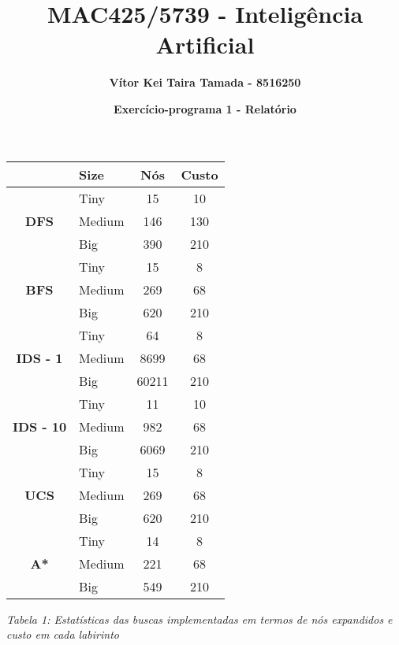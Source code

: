 \documentclass{article}
\title{\textbf{MAC425/5739 - Inteligência Artificial}}
\author{\textbf{Vítor Kei Taira Tamada - 8516250}}
\date{\textbf{Exercício-programa 1 - Relatório}}
\begin{document}
\maketitle


\begin{center}
	\begin{tabular}{c | l | c | c}
		\hline
			&
			\textbf{Size}&
			\textbf{Nós}&
			\textbf{Custo} \\ \hline
			& Tiny & 15 & 10 \\
			\textbf{DFS} & Medium & 146 & 130\\
			& Big & 390 & 210 \\ \hline
			
			& Tiny & 15 & 8 \\ 
			\textbf{BFS}& Medium & 269 & 68 \\
			& Big & 620 & 210 \\ \hline
			
			& Tiny & 64 & 8 \\
			\textbf{IDS - 1 \footnotemark } & Medium & 8699 & 68 \\
			& Big & 60211 & 210 \\ \hline
			
			& Tiny & 11 & 10 \\
			\textbf{IDS - 10 \footnotemark[\value{footnote}] } & Medium & 982 & 68 \\
			& Big & 6069 & 210 \\ \hline
			
			& Tiny & 15 & 8 \\
			\textbf{UCS} & Medium & 269 & 68 \\
			& Big & 620 & 210 \\ \hline

			& Tiny & 14 & 8 \\
			\textbf{A*} & Medium & 221 & 68 \\
			& Big & 549 & 210 \\ \hline
	\end{tabular}
	
	\bigskip
	\emph{Tabela 1: Estatísticas das buscas implementadas em termos de nós expandidos e custo em cada labirinto}
	
\end{center}

\end{document}
